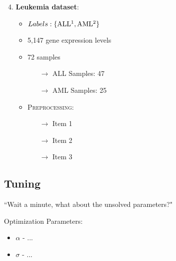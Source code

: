 \documentclass[serif]{beamer}
\begin{document}
\begin{frame}[t]
{\begin{enumerate}
\begin{itemize}
				\end{itemize}
		\end{enumerate}
		}
		{
		\begin{enumerate}
			\setcounter{enumi}{3}
			\item {\bf Leukemia dataset}:
					\begin{itemize}
					\item  $ Labels: 	\left
						 \{ \text{ALL}\footnote{Acute lymphoblastic leukemia},
						 \text{AML}\footnote{Acute myeloid leukemia}
								 \right \}$
					\item 5,147 gene expression levels
					\item 72 samples
					\begin{itemize}
						\item[$\rightarrow$] \textsc{ALL} Samples: 47
						\item[$\rightarrow$] \textsc{AML} Samples: 25
					\end{itemize}
					\item  \textsc{Preprocessing:}
					\begin{itemize}
						\item[$\rightarrow$] Item 1
						\item[$\rightarrow$] Item 2
						\item[$\rightarrow$] Item 3
					\end{itemize}
				\end{itemize}
		\end{enumerate}		
		}
	\end{frame}

	\subsection{Tuning}
	\begin{frame}
		\begin{center}
			\huge
			``Wait a minute, what about the unsolved parameters?"
		\end{center}
	\end{frame}
	
	\begin{frame}
		\begin{block}{Optimization Parameters:}
			\begin{itemize}
				\item  $\alpha$ - ...
				\item  $\sigma$ - ...
			\end{itemize}
		\end{block}	
	\end{frame}
	
\end{document}
